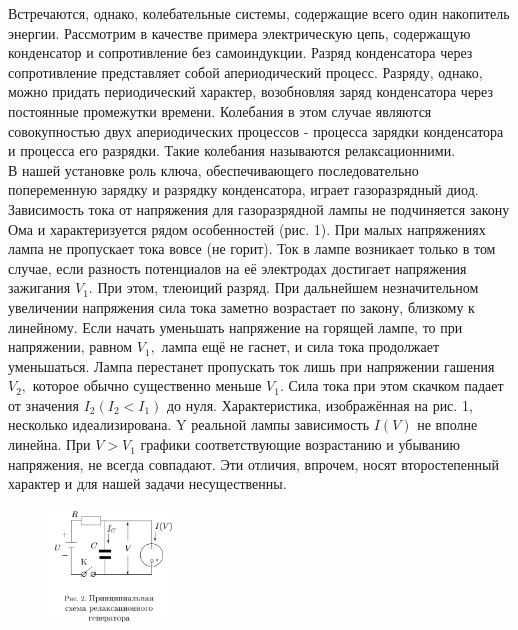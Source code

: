 Встречаются, однако, колебательные системы, содержащие всего один накопитель энергии. Рассмотрим в качестве примера электрическую цепь, содержащую конденсатор и сопротивление без самоиндукции. Разряд конденсатора через сопротивление представляет собой апериодический процесс. Разряду, однако, можно придать периодический характер, возобновляя заряд конденсатора через постоянные промежутки времени. Колебания в этом случае являются совокупностью двух апериодических процессов - процесса зарядки конденсатора и процесса его разрядки. Такие колебания называются релаксационними.\\
В нашей установке роль ключа, обеспечивающего последовательно попеременную зарядку и разрядку конденсатора, играет газоразрядный диод. Зависимость тока от напряжения для газоразрядной лампы не подчиняется закону Ома и характеризуется рядом особенностей (рис. 1). При малых напряжениях лампа не пропускает тока вовсе (не горит). Ток в лампе возникает только в том случае, если разность потенциалов на её электродах достигает напряжения зажигания $V_{1} .$ При этом, тлеюиций разряд. При дальнейшем незначительном увеличении напряжения сила тока заметно возрастает по закону, близкому к линейному. 
Если начать уменьшать напряжение на горящей лампе, то при напряжении, равном $V_{1},$ лампа ещё не гаснет, и сила тока продолжает уменьшаться. Лампа перестанет пропускать ток лишь при напряжении гашения $V_{2},$ которое обычно существенно меньше $V_{1}$. Сила тока при этом скачком падает от значения $I_{2}\left(I_{2}<I_{1}\right)$ до нуля. Характеристика, изображённая на рис. 1, несколько идеализирована. $\mathrm{Y}$ реальной лампы зависимость $I(V)$ не вполне линейна. При $V>V_{1}$ графики
соответствующие возрастанию и убыванию напряжения, не всегда совпадают. Эти отличия, впрочем, носят второстепенный характер и для нашей задачи несущественны.
 
\newpage

\begin{figure} 
\begin{center}
\includegraphics[width=0.3\textwidth]{2.PNG} 
\end{center}
\end{figure}

